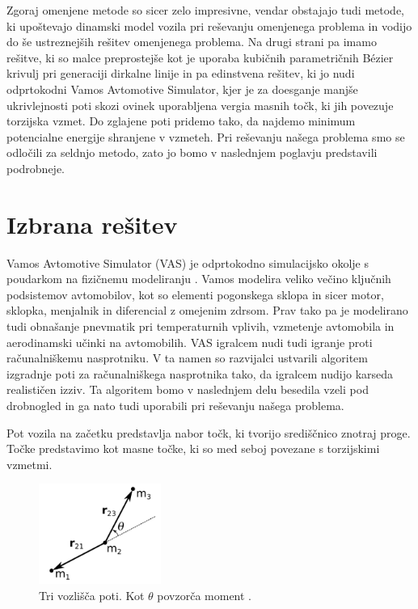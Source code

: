 \documentclass[10pt,a4paper]{article}
\begin{document}
Zgoraj omenjene metode so sicer zelo impresivne, vendar obstajajo tudi metode, ki upoštevajo dinamski model vozila pri reševanju omenjenega problema in vodijo do še ustreznejših rešitev omenjenega problema. Na drugi strani pa imamo rešitve, ki so malce preprostejše kot je uporaba kubičnih parametričnih Bézier krivulj pri generaciji dirkalne linije in pa edinstvena rešitev, ki jo nudi odprtokodni Vamos Avtomotive Simulator, kjer je za doesganje manjše ukrivlejnosti poti skozi ovinek uporabljena vergia masnih točk, ki jih povezuje torzijska vzmet. Do zglajene poti pridemo tako, da najdemo minimum potencialne energije shranjene v vzmeteh. Pri reševanju našega problema smo se odločili za seldnjo metodo, zato jo bomo v naslednjem poglavju predstavili podrobneje.

\section{Izbrana rešitev}

Vamos Avtomotive Simulator (VAS) je odprtokodno simulacijsko okolje s poudarkom na fizičnemu modeliranju \cite{VAS}. Vamos modelira veliko večino ključnih podsistemov avtomobilov, kot so elementi pogonskega sklopa in sicer motor, sklopka, menjalnik in diferencial z omejenim zdrsom. Prav tako pa je modelirano tudi obnašanje pnevmatik pri temperaturnih vplivih, vzmetenje avtomobila in aerodinamski učinki na avtomobilih. VAS igralcem nudi tudi igranje proti računalniškemu nasprotniku. V ta namen so razvijalci ustvarili algoritem izgradnje poti za računalniškega nasprotnika tako, da igralcem nudijo karseda realističen izziv. Ta algoritem bomo v naslednjem delu besedila vzeli pod drobnogled in ga nato tudi uporabili pri reševanju našega problema.

Pot vozila na začetku predstavlja nabor točk, ki tvorijo središčnico znotraj proge. Točke predstavimo kot masne točke, ki so med seboj povezane s torzijskimi vzmetmi.

\begin{figure}[H]
	\centering
	\includegraphics[width=4cm]{pic/slika5.png}
	\caption{Tri vozlišča poti. Kot $\theta$ povzorča moment \cite{VAS}.}
	\label{fig:slika}
\end{figure}
\end{document}

